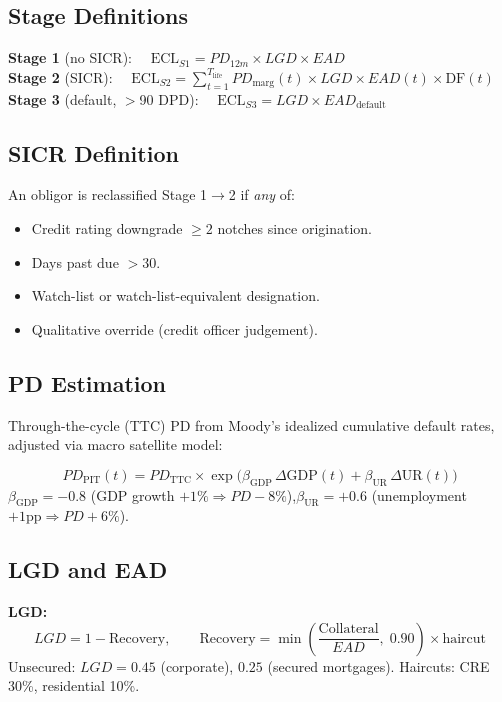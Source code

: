 \documentclass{apex_mdd}
\begin{document}
\subsection{Stage Definitions}
\begin{formulabox}
\textbf{Stage 1} (no SICR): $\quad\mathrm{ECL}_{S1} = PD_{12m} \times LGD \times EAD$\\[4pt]
\textbf{Stage 2} (SICR): $\quad\mathrm{ECL}_{S2} = \sum_{t=1}^{T_{\mathrm{life}}} PD_{\mathrm{marg}}(t) \times LGD \times EAD(t) \times \mathrm{DF}(t)$\\[4pt]
\textbf{Stage 3} (default, $>$90 DPD): $\quad\mathrm{ECL}_{S3} = LGD \times EAD_{\mathrm{default}}$
\end{formulabox}

\subsection{SICR Definition}
An obligor is reclassified Stage 1$\to$2 if \textit{any} of:
\begin{itemize}
  \item Credit rating downgrade $\geq 2$ notches since origination.
  \item Days past due $> 30$.
  \item Watch-list or watch-list-equivalent designation.
  \item Qualitative override (credit officer judgement).
\end{itemize}

\subsection{PD Estimation}
Through-the-cycle (TTC) PD from Moody's idealized cumulative default rates, adjusted via macro satellite model:
\begin{formulabox}
\[
  PD_{\mathrm{PIT}}(t) = PD_{\mathrm{TTC}} \times \exp\!\bigl(\beta_{\mathrm{GDP}}\,\Delta\mathrm{GDP}(t) + \beta_{\mathrm{UR}}\,\Delta\mathrm{UR}(t)\bigr)
\]
$\beta_{\mathrm{GDP}} = -0.8$ (GDP growth $+1\% \Rightarrow PD -8\%$),\quad $\beta_{\mathrm{UR}} = +0.6$ (unemployment $+1\mathrm{pp} \Rightarrow PD +6\%$).
\end{formulabox}

\subsection{LGD and EAD}
\textbf{LGD:}
\[
  LGD = 1 - \text{Recovery},\qquad \text{Recovery} = \min\!\left(\frac{\text{Collateral}}{EAD},\;0.90\right)\times\text{haircut}
\]
Unsecured: $LGD = 0.45$ (corporate), $0.25$ (secured mortgages). Haircuts: CRE 30\%, residential 10\%.
\end{document}
